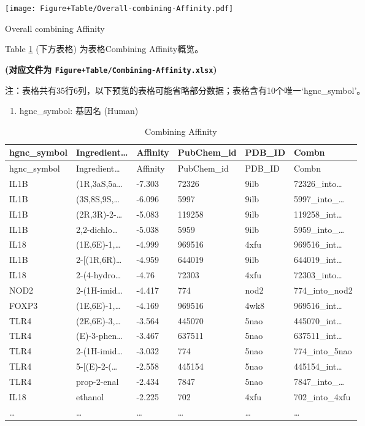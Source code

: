 \documentclass[
]{article}
\providecommand{\tightlist}{%
  \setlength{\itemsep}{0pt}\setlength{\parskip}{0pt}}
\begin{document}
\def\@captype{figure}
\begin{center}
\texttt{[image: Figure+Table/Overall-combining-Affinity.pdf]}
\caption{Overall combining Affinity}\label{fig:Overall-combining-Affinity}
\end{center}

Table \ref{tab:Combining-Affinity} (下方表格) 为表格Combining Affinity概览。

\textbf{(对应文件为 \texttt{Figure+Table/Combining-Affinity.xlsx})}

\begin{center}\begin{tcolorbox}[colback=gray!10, colframe=gray!50, width=0.9\linewidth, arc=1mm, boxrule=0.5pt]注：表格共有35行6列，以下预览的表格可能省略部分数据；表格含有10个唯一`hgnc\_symbol'。
\end{tcolorbox}
\end{center}
\begin{center}\begin{tcolorbox}[colback=gray!10, colframe=gray!50, width=0.9\linewidth, arc=1mm, boxrule=0.5pt]\begin{enumerate}\tightlist
\item hgnc\_symbol:  基因名 (Human)
\end{enumerate}\end{tcolorbox}
\end{center}

\begin{longtable}[]{@{}llllll@{}}
\caption{\label{tab:Combining-Affinity}Combining Affinity}\tabularnewline
\toprule
hgnc\_symbol & Ingredient\ldots{} & Affinity & PubChem\_id & PDB\_ID & Combn\tabularnewline
\midrule
\endfirsthead
\toprule
hgnc\_symbol & Ingredient\ldots{} & Affinity & PubChem\_id & PDB\_ID & Combn\tabularnewline
\midrule
\endhead
IL1B & (1R,3aS,5a\ldots{} & -7.303 & 72326 & 9ilb & 72326\_into\ldots{}\tabularnewline
IL1B & (3S,8S,9S,\ldots{} & -6.096 & 5997 & 9ilb & 5997\_into\_\ldots{}\tabularnewline
IL1B & (2R,3R)-2-\ldots{} & -5.083 & 119258 & 9ilb & 119258\_int\ldots{}\tabularnewline
IL1B & 2,2-dichlo\ldots{} & -5.038 & 5959 & 9ilb & 5959\_into\_\ldots{}\tabularnewline
IL18 & (1E,6E)-1,\ldots{} & -4.999 & 969516 & 4xfu & 969516\_int\ldots{}\tabularnewline
IL1B & 2-{[}(1R,6R)\ldots{} & -4.959 & 644019 & 9ilb & 644019\_int\ldots{}\tabularnewline
IL18 & 2-(4-hydro\ldots{} & -4.76 & 72303 & 4xfu & 72303\_into\ldots{}\tabularnewline
NOD2 & 2-(1H-imid\ldots{} & -4.417 & 774 & nod2 & 774\_into\_nod2\tabularnewline
FOXP3 & (1E,6E)-1,\ldots{} & -4.169 & 969516 & 4wk8 & 969516\_int\ldots{}\tabularnewline
TLR4 & (2E,6E)-3,\ldots{} & -3.564 & 445070 & 5nao & 445070\_int\ldots{}\tabularnewline
TLR4 & (E)-3-phen\ldots{} & -3.467 & 637511 & 5nao & 637511\_int\ldots{}\tabularnewline
TLR4 & 2-(1H-imid\ldots{} & -3.032 & 774 & 5nao & 774\_into\_5nao\tabularnewline
TLR4 & 5-{[}(E)-2-(\ldots{} & -2.558 & 445154 & 5nao & 445154\_int\ldots{}\tabularnewline
TLR4 & prop-2-enal & -2.434 & 7847 & 5nao & 7847\_into\_\ldots{}\tabularnewline
IL18 & ethanol & -2.225 & 702 & 4xfu & 702\_into\_4xfu\tabularnewline
\ldots{} & \ldots{} & \ldots{} & \ldots{} & \ldots{} & \ldots{}\tabularnewline
\bottomrule
\end{longtable}
\end{document}
